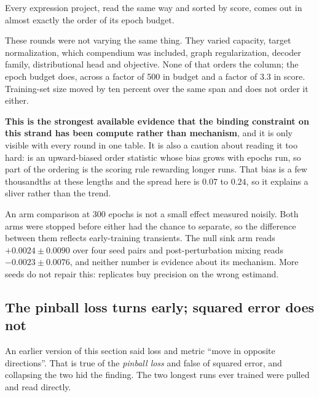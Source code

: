 Every expression project, read the same way and sorted by score, comes out in almost
exactly the order of its epoch budget.



These rounds were not varying the same thing. They varied capacity, target normalization,
which compendium was included, graph regularization, decoder family, distributional head
and objective. None of that orders the column; the epoch budget does, across a factor of
500 in budget and a factor of 3.3 in score. Training-set size moved by ten percent over the
same span and does not order it either.

\textbf{This is the strongest available evidence that the binding constraint on this strand
has been compute rather than mechanism}, and it is only visible with every round in one
table. It is also a caution about reading it too hard:  is an upward-biased
order statistic whose bias grows with epochs run, so part of the ordering is the scoring
rule rewarding longer runs. That bias is a few thousandths at these lengths and the spread
here is $0.07$ to $0.24$, so it explains a sliver rather than the trend.

 An arm comparison at 300 epochs is not a small effect measured
noisily. Both arms were stopped before either had the chance to separate, so the difference
between them reflects early-training transients. The null sink arm reads
$+0.0024 \pm 0.0090$ over four seed pairs and post-perturbation mixing reads
$-0.0023 \pm 0.0076$, and neither number is evidence about its mechanism. More seeds do not
repair this: replicates buy precision on the wrong estimand.

\subsection{The pinball loss turns early; squared error does not}
\label{sec:objective}

 An earlier version of this section said loss and metric ``move in
opposite directions''. That is true of the \emph{pinball loss} and false of squared error,
and collapsing the two hid the finding. The two longest runs ever trained were pulled and
read directly.

